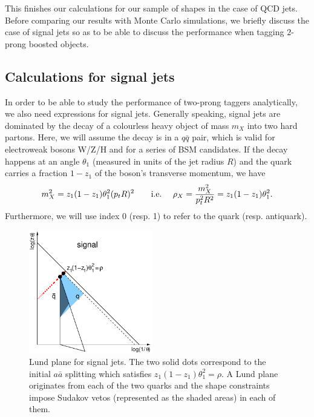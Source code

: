 This finishes our calculations for our sample of shapes in the case of
QCD jets. Before comparing our results with Monte Carlo simulations,
we briefly discuss the case of signal jets so as to be able to discuss
the performance when tagging $2$-prong boosted objects.


\subsection{Calculations for signal jets}\label{sec:two-prongs-analytic-signal}

In order to be able to study the performance of two-prong taggers
analytically, we also need expressions for signal jets. Generally
speaking, signal jets are dominated by the decay of a colourless heavy
object of mass $m_X$ into two hard partons. Here, we will assume the
decay is in a $q\bar q$ pair, which is valid for electroweak bosons
W/Z/H and for a series of BSM candidates.
%
If the decay happens at an angle $\theta_1$ (measured in units of the
jet radius $R$) and the quark carries a fraction $1-z_1$ of the
boson's transverse momentum, we have
\begin{equation}\label{eq:signal-mass-constraint}
  m_X^2=z_1 (1-z_1) \theta_1^2 (p_tR)^2
  \qquad\text{i.e.\ }\quad
  \rho_X = \frac{m_X^2}{p_t^2R^2}=z_1 (1-z_1) \theta_1^2.
\end{equation}
Furthermore, we will use index 0 (resp. 1) to refer to the quark
(resp. antiquark).


\begin{figure}
  \centerline{\includegraphics[width=0.48\textwidth]{figures/Lund-tau21_or_D2-signal.pdf}}
  \caption{Lund plane for signal jets. The two solid dots correspond
    to the initial $a\bar{a}$ splitting which satisfies
    $z_1(1-z_1)\theta_1^2=\rho$. A
    Lund plane originates from each of the two quarks and the shape
    constraints impose Sudakov vetos (represented as the shaded areas)
    in each of them.}\label{fig:lund-shape-signal}
\end{figure}  

